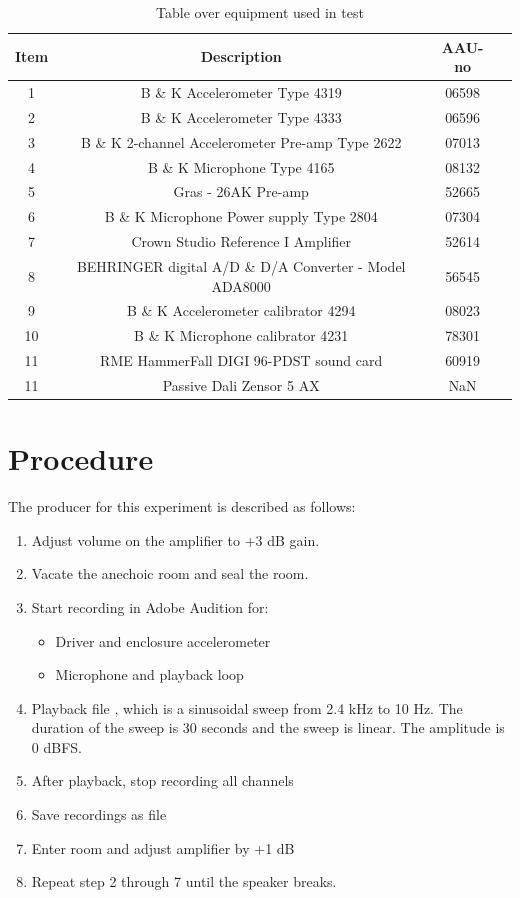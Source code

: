 \begin{table}[H]
\centering
{}
\begin{tabular}{S[table-format=1]ccc} \toprule
    {Item} & {Description} & {AAU-no} \\       &  B \& K Accelerometer Type 4319  & 06598   \\ 
    2      &  B \& K Accelerometer Type 4333  & 06596   \\ 
    3      &  B \& K 2-channel Accelerometer Pre-amp Type 2622  & 07013   \\
    4      &  B \& K Microphone Type 4165  & 08132   \\
    5      &  Gras - 26AK Pre-amp & 52665   \\
    6      &  B \& K Microphone Power supply Type 2804  & 07304   \\
    7      &  Crown Studio Reference I Amplifier & 52614   \\
    8      &  BEHRINGER digital A/D \& D/A Converter - Model ADA8000   & 56545   \\
    9      &  B \& K Accelerometer calibrator 4294 & 08023   \\
    10     &  B \& K Microphone calibrator 4231 & 78301   \\
    11     &  RME HammerFall DIGI 96-PDST sound card & 60919  \\
    11     &  Passive Dali Zensor 5 AX & NaN  \\ \bottomrule 
\end{tabular}
\caption{Table over equipment used in test}
\label{tab:UsedEquipment1}
\end{table}



\section{Procedure}\label{sec:SpeakerTestProcedure1}

The producer for this experiment is described as follows:
\begin{enumerate}
\item Adjust volume on the amplifier to +3 dB gain.
\item Vacate the anechoic room and seal the room.
\item Start recording in Adobe Audition for:
\begin{itemize}
\item Driver and enclosure accelerometer
\item Microphone and playback loop
\end{itemize}
\item Playback file , which is a sinusoidal sweep from 2.4 kHz to 10 Hz. The duration of the sweep is 30 seconds and the sweep is linear. The amplitude is 0 dBFS.
\item After playback, stop recording all channels
\item Save recordings as  file
\item Enter room and adjust amplifier by +1 dB
\item Repeat step 2 through 7 until the speaker breaks.
\end{enumerate}

